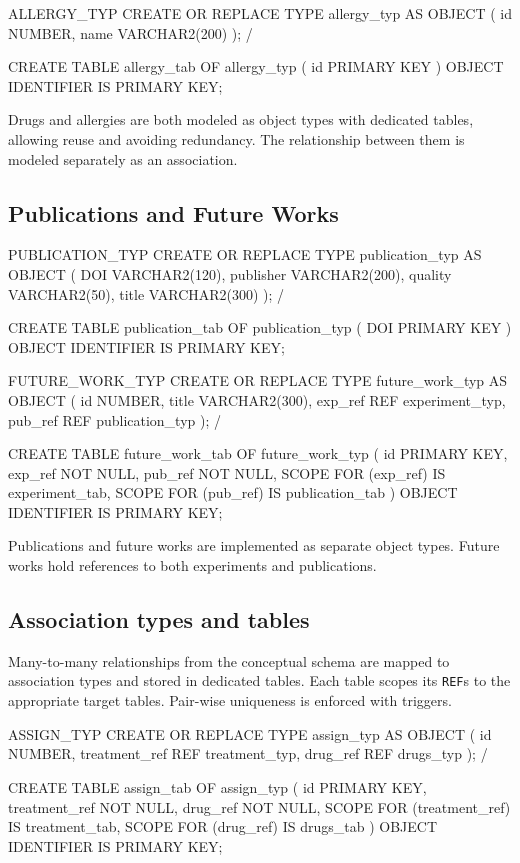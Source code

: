 \documentclass[11pt,a4paper]{article}
\begin{document}
\begin{sqlbox}{ALLERGY\_TYP}
CREATE OR REPLACE TYPE allergy_typ AS OBJECT (
  id    NUMBER,
  name  VARCHAR2(200)
);
/

CREATE TABLE allergy_tab OF allergy_typ (
  id PRIMARY KEY
) OBJECT IDENTIFIER IS PRIMARY KEY;
\end{sqlbox}

Drugs and allergies are both modeled as object types with dedicated tables, allowing reuse and avoiding redundancy. The relationship between them is modeled separately as an association.

\subsection{Publications and Future Works}
\begin{sqlbox}{PUBLICATION\_TYP}
CREATE OR REPLACE TYPE publication_typ AS OBJECT (
  DOI        VARCHAR2(120),
  publisher  VARCHAR2(200),
  quality    VARCHAR2(50),
  title      VARCHAR2(300)
);
/

CREATE TABLE publication_tab OF publication_typ (
  DOI PRIMARY KEY
) OBJECT IDENTIFIER IS PRIMARY KEY;
\end{sqlbox}

\begin{sqlbox}{FUTURE\_WORK\_TYP}
CREATE OR REPLACE TYPE future_work_typ AS OBJECT (
  id        NUMBER,
  title     VARCHAR2(300),
  exp_ref   REF experiment_typ,
  pub_ref   REF publication_typ
);
/

CREATE TABLE future_work_tab OF future_work_typ (
  id PRIMARY KEY,
  exp_ref NOT NULL,
  pub_ref NOT NULL,
  SCOPE FOR (exp_ref) IS experiment_tab,
  SCOPE FOR (pub_ref) IS publication_tab
) OBJECT IDENTIFIER IS PRIMARY KEY;
\end{sqlbox}

Publications and future works are implemented as separate object types. Future works hold references to both experiments and publications.

\subsection{Association types and tables}
Many-to-many relationships from the conceptual schema are mapped to association types and stored in dedicated tables. Each table scopes its \texttt{REF}s to the appropriate target tables. Pair-wise uniqueness is enforced with triggers.

\begin{sqlbox}{ASSIGN\_TYP}
CREATE OR REPLACE TYPE assign_typ AS OBJECT (
  id             NUMBER,
  treatment_ref  REF treatment_typ,
  drug_ref       REF drugs_typ
);
/

CREATE TABLE assign_tab OF assign_typ (
  id PRIMARY KEY,
  treatment_ref NOT NULL,
  drug_ref NOT NULL,
  SCOPE FOR (treatment_ref) IS treatment_tab,
  SCOPE FOR (drug_ref) IS drugs_tab
) OBJECT IDENTIFIER IS PRIMARY KEY;
\end{sqlbox}
\end{document}
